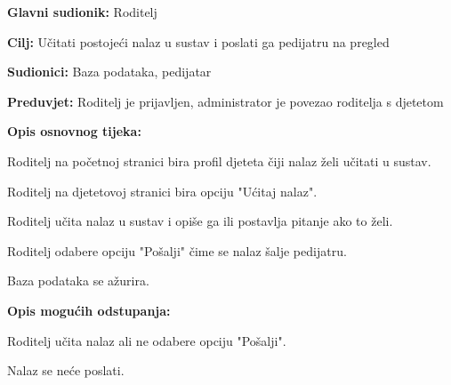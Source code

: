 						\noindent {}
					\begin{packed_item}
						
						\item \textbf{Glavni sudionik: }Roditelj
						\item  \textbf{Cilj:} Učitati postojeći nalaz u sustav i poslati ga pedijatru na pregled
						\item  \textbf{Sudionici:} Baza podataka, pedijatar
						\item  \textbf{Preduvjet:} Roditelj je prijavljen, administrator je povezao roditelja s djetetom
						\item  \textbf{Opis osnovnog tijeka:}
						
						\item[] \begin{packed_enum}
							
							\item Roditelj na početnoj stranici bira profil djeteta čiji nalaz želi učitati u sustav.
							\item Roditelj na djetetovoj stranici bira opciju "Ućitaj nalaz".
							\item Roditelj učita nalaz u sustav i opiše ga ili postavlja pitanje ako to želi.
							\item Roditelj odabere opciju "Pošalji" čime se nalaz šalje pedijatru.
							\item Baza podataka se ažurira.
						\end{packed_enum}
						
						\item  \textbf{Opis mogućih odstupanja:}
						
						\item[] \begin{packed_item}
							
							\item[4.a] Roditelj učita nalaz ali ne odabere opciju "Pošalji".
							\item[] \begin{packed_enum}
								
								\item Nalaz se neće poslati.
							\end{packed_enum}
							
							
						\end{packed_item}
					\end{packed_item}
					
